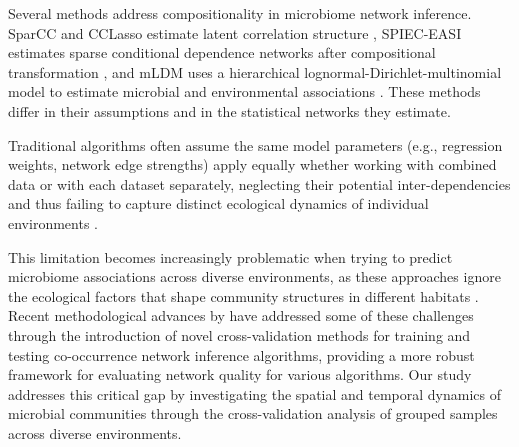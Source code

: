 \documentclass[]{Liebert_Author_revised}
\providecommand{\DIFadd}[1]{{\ifmmode\else\leavevmode\fi\color{blue}#1}} %
\providecommand{\DIFaddbegin}{} %
\providecommand{\DIFaddend}{} %
\begin{document}
\DIFaddbegin \DIFadd{Several methods address compositionality in microbiome network inference.
SparCC and CCLasso estimate latent correlation structure \citep{friedman2012sparcc,fang2015cclasso}, SPIEC-EASI estimates sparse conditional dependence networks after compositional transformation \citep{Kurtz2015}, and mLDM uses a hierarchical lognormal-Dirichlet-multinomial model to estimate microbial and environmental associations \citep{yang2017mldm}.
These methods differ in their assumptions and in the statistical networks they estimate.
}

\DIFaddend Traditional algorithms often assume the same model parameters (e.g., regression weights, network edge strengths) apply equally whether working with combined data or with each dataset separately, neglecting their potential inter-dependencies and thus failing to capture distinct ecological dynamics of individual environments \citep{knights2011bayesian,marcos2021applications}.

This limitation becomes increasingly problematic when trying to predict microbiome associations across diverse environments, as these approaches ignore the ecological factors that shape community structures in different  \DIFaddbegin \DIFadd{habitats }\DIFaddend \citep{costello2012application}.
Recent methodological advances by \citet{agyapong2025cross} have addressed some of these challenges through the introduction of novel cross-validation methods for training and testing co-occurrence network inference algorithms, providing a more robust framework for evaluating network quality for various algorithms.
Our study addresses this critical gap by investigating the spatial and temporal dynamics of microbial communities through the cross-validation analysis of  \DIFaddbegin \DIFadd{grouped samples }\DIFaddend across diverse environments.
\end{document}
